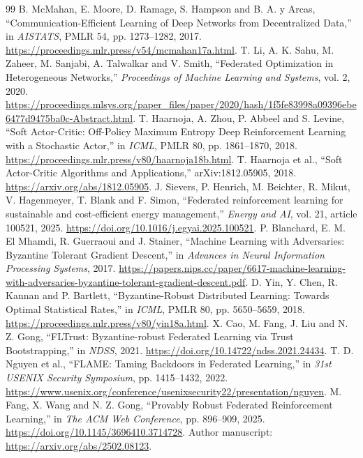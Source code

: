 \begin{thebibliography}{99}
 B. McMahan, E. Moore, D. Ramage, S. Hampson and B. A. y Arcas, ``Communication-Efficient Learning of Deep Networks from Decentralized Data,'' in \emph{AISTATS}, PMLR 54, pp. 1273--1282, 2017. \url{https://proceedings.mlr.press/v54/mcmahan17a.html}.
 T. Li, A. K. Sahu, M. Zaheer, M. Sanjabi, A. Talwalkar and V. Smith, ``Federated Optimization in Heterogeneous Networks,'' \emph{Proceedings of Machine Learning and Systems}, vol. 2, 2020. \url{https://proceedings.mlsys.org/paper_files/paper/2020/hash/1f5fe83998a09396ebe6477d9475ba0c-Abstract.html}.
 T. Haarnoja, A. Zhou, P. Abbeel and S. Levine, ``Soft Actor-Critic: Off-Policy Maximum Entropy Deep Reinforcement Learning with a Stochastic Actor,'' in \emph{ICML}, PMLR 80, pp. 1861--1870, 2018. \url{https://proceedings.mlr.press/v80/haarnoja18b.html}.
 T. Haarnoja et al., ``Soft Actor-Critic Algorithms and Applications,'' arXiv:1812.05905, 2018. \url{https://arxiv.org/abs/1812.05905}.
 J. Sievers, P. Henrich, M. Beichter, R. Mikut, V. Hagenmeyer, T. Blank and F. Simon, ``Federated reinforcement learning for sustainable and cost-efficient energy management,'' \emph{Energy and AI}, vol. 21, article 100521, 2025. \url{https://doi.org/10.1016/j.egyai.2025.100521}.
 P. Blanchard, E. M. El Mhamdi, R. Guerraoui and J. Stainer, ``Machine Learning with Adversaries: Byzantine Tolerant Gradient Descent,'' in \emph{Advances in Neural Information Processing Systems}, 2017. \url{https://papers.nips.cc/paper/6617-machine-learning-with-adversaries-byzantine-tolerant-gradient-descent.pdf}.
 D. Yin, Y. Chen, R. Kannan and P. Bartlett, ``Byzantine-Robust Distributed Learning: Towards Optimal Statistical Rates,'' in \emph{ICML}, PMLR 80, pp. 5650--5659, 2018. \url{https://proceedings.mlr.press/v80/yin18a.html}.
 X. Cao, M. Fang, J. Liu and N. Z. Gong, ``FLTrust: Byzantine-robust Federated Learning via Trust Bootstrapping,'' in \emph{NDSS}, 2021. \url{https://doi.org/10.14722/ndss.2021.24434}.
 T. D. Nguyen et al., ``FLAME: Taming Backdoors in Federated Learning,'' in \emph{31st USENIX Security Symposium}, pp. 1415--1432, 2022. \url{https://www.usenix.org/conference/usenixsecurity22/presentation/nguyen}.
 M. Fang, X. Wang and N. Z. Gong, ``Provably Robust Federated Reinforcement Learning,'' in \emph{The ACM Web Conference}, pp. 896--909, 2025. \url{https://doi.org/10.1145/3696410.3714728}. Author manuscript: \url{https://arxiv.org/abs/2502.08123}.

\end{thebibliography}
